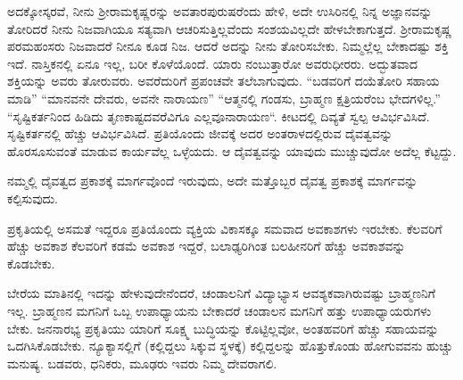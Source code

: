 ಅದಕ್ಕೋಸ್ಕರವೆ, ನೀನು ಶ‍್ರೀರಾಮಕೃಷ್ಣರನ್ನು ಅವತಾರಪುರುಷರೆಂದು ಹೇಳಿ, ಅದೇ ಉಸಿರಿನಲ್ಲಿ ನಿನ್ನ ಅಜ್ಞಾನವನ್ನು ತೋರಿದರೆ ನೀನು ನಿಜವಾಗಿಯೂ ಸತ್ಯವಾಗಿ ಆಚರಿಸುತ್ತಿಲ್ಲವೆಂದು ಸಂಶಯವಿಲ್ಲದೇ ಹೇಳಬೇಕಾಗುತ್ತದೆ. ಶ‍್ರೀರಾಮಕೃಷ್ಣ ಪರಮಹಂಸರು ನಿಜವಾದರೆ ನೀನೂ ಕೂಡ ನಿಜ. ಆದರೆ ಅದನ್ನು ನೀನು ತೋರಿಸಬೇಕು. ನಿಮ್ಮಲ್ಲೆಲ್ಲ ಬೇಕಾದಷ್ಟು ಶಕ್ತಿ ಇದೆ. ನಾಸ್ತಿಕನಲ್ಲಿ ಏನೂ ಇಲ್ಲ, ಬರೀ ಕೊಳೆಯೊಂದೆ. ಯಾರು ನಂಬುತ್ತಾರೋ ಅವರುಧೀರರು. ಅದ್ಭುತವಾದ ಶಕ್ತಿಯನ್ನು ಅವರು ತೋರುವರು. ಅವರೆದುರಿಗೆ ಪ್ರಪಂಚವೇ ತಲೆಬಾಗುವುದು. “ಬಡವರಿಗೆ ದಯೆತೋರಿ ಸಹಾಯ ಮಾಡಿ” “ಮಾನವನೇ ದೇವರು, ಅವನೇ ನಾರಾಯಣ” “ಆತ್ಮನಲ್ಲಿ ಗಂಡಸು, ಬ್ರಾಹ್ಮಣ ಕ್ಷತ್ರಿಯರೆಂಬ ಭೇದಗಳಿಲ್ಲ.” “ಸೃಷ್ಟಿಕರ್ತನಿಂದ ಹಿಡಿದು ತೃಣಕಾಷ್ಟದವರೆವಿಗೂ ಎಲ್ಲವೂ\break ನಾರಾಯಣ“. ಕೀಟದಲ್ಲಿ ದಿವ್ಯತೆ ಸ್ವಲ್ಪ ಆವಿರ್ಭವಿಸಿದೆ. ಸೃಷ್ಟಿಕರ್ತನಲ್ಲಿ ಹೆಚ್ಚು ಆವಿರ್ಭವಿಸಿದೆ. ಪ್ರತಿಯೊಂದು ಜೀವಕ್ಕೆ ಅದರ ಅಂತರಾಳದಲ್ಲಿರುವ ದೈವತ್ವವನ್ನು ಹೊರಸೂಸುವಂತೆ ಮಾಡುವ ಕಾರ್ಯವೆಲ್ಲ ಒಳ್ಳೆಯದು. ಆ ದೈವತ್ವವನ್ನು ಯಾವುದು ಮುಚ್ಚುವುದೋ ಅದೆಲ್ಲ ಕೆಟ್ಟದ್ದು.

ನಮ್ಮಲ್ಲಿ ದೈವತ್ವದ ಪ್ರಕಾಶಕ್ಕೆ ಮಾರ್ಗವೊಂದೆ ಇರುವುದು, ಅದೇ ಮತ್ತೊಬ್ಬರ ದೈವತ್ವ ಪ್ರಕಾಶಕ್ಕೆ ಮಾರ್ಗವನ್ನು ಕಲ್ಪಿಸುವುದು.

ಪ್ರಕೃತಿಯಲ್ಲಿ ಅಸಮತೆ ಇದ್ದರೂ ಪ್ರತಿಯೊಂದು ವ್ಯಕ್ತಿಯ ವಿಕಾಸಕ್ಕೂ ಸಮವಾದ ಅವಕಾಶಗಳು ಇರಬೇಕು. ಕೆಲವರಿಗೆ ಹೆಚ್ಚು ಅವಕಾಶ ಕೆಲವರಿಗೆ ಕಡಮೆ ಅವಕಾಶ ಇದ್ದರೆ, ಬಲಾಢ್ಯರಿಗಿಂತ ಬಲಹೀನರಿಗೆ ಹೆಚ್ಚು ಅವಕಾಶವನ್ನು ಕೊಡಬೇಕು.

ಬೇರೆಯ ಮಾತಿನಲ್ಲಿ ಇದನ್ನು ಹೇಳುವುದೇನೆಂದರೆ, ಚಂಡಾಲನಿಗೆ ವಿದ್ಯಾಭ್ಯಾಸ ಆವಶ್ಯಕವಾಗಿರುವಷ್ಟು ಬ್ರಾಹ್ಮಣನಿಗೆ ಇಲ್ಲ. ಬ್ರಾಹ್ಮಣನ ಮಗನಿಗೆ ಒಬ್ಬ ಉಪಾಧ್ಯಾಯನು ಬೇಕಾದರೆ ಚಂಡಾಲನ ಮಗನಿಗೆ ಹತ್ತು ಉಪಾಧ್ಯಾಯರುಗಳು ಬೇಕು. ಜನನಾರಭ್ಯ ಪ್ರಕೃತಿಯು ಯಾರಿಗೆ ಸೂಕ್ಷ್ಮ ಬುದ್ಧಿಯನ್ನು ಕೊಟ್ಟಿಲ್ಲವೋ, ಅಂತಹವರಿಗೆ ಹೆಚ್ಚು ಸಹಾಯವನ್ನು ಒದಗಿಸಿಕೊಡಬೇಕು. ನ್ಯೂಕ್ಯಾಸಲ್ಲಿಗೆ (ಕಲ್ಲಿದ್ದಲು ಸಿಕ್ಕುವ ಸ್ಥಳಕ್ಕೆ) ಕಲ್ಲಿದ್ದಲನ್ನು ಹೊತ್ತುಕೊಂಡು ಹೋಗುವವನು ಹುಚ್ಚು ಮನುಷ್ಯ. ಬಡವರು, ಧನಿಕರು, ಮೂಢರು ಇವರು ನಿಮ್ಮ ದೇವರಾಗಲಿ.

